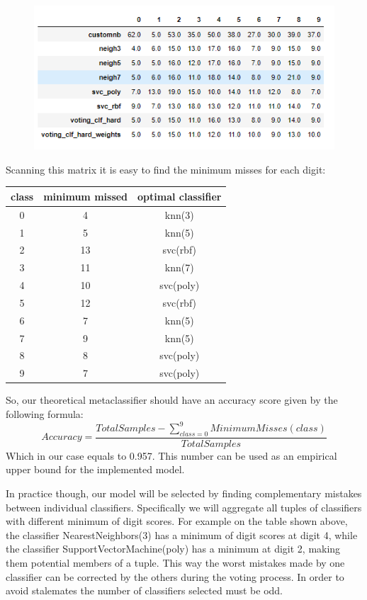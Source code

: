 \documentclass{article}
\begin{document}
    \begin{figure}[ht]
        \includegraphics[width = 1.1\textwidth]{Classifiers_mistakes}
    \end{figure}
    \newpage
    Scanning this matrix it is easy to find the minimum misses for each digit:

        \begin{table}[ht]
            \centering
        
            \begin{tabular}{|c| c| c|}
            \hline
            class & minimum missed & optimal classifier \\
            \hline
            0 & 4 & knn(3)\\
            1 & 5 & knn(5) \\
            2 & 13 & svc(rbf) \\
            3 & 11 & knn(7) \\
            4 & 10 & svc(poly) \\
            5 & 12 & svc(rbf) \\
            6 & 7 & knn(5) \\
            7 & 9 & knn(5) \\
            8 & 8 & svc(poly) \\
            9 & 7 & svc(poly) \\
            \hline
            \end{tabular}
        \end{table}
    
    So, our theoretical metaclassifier should have an accuracy score given by the following formula:
    \[Accuracy = \frac{TotalSamples - \sum\limits_{class =0}^{9}MinimumMisses(class)}{TotalSamples}\]
    Which in our case equals to 0.957. This number can be used as an empirical upper bound for the implemented model.

    In practice though, our model will be selected by finding complementary mistakes between individual classifiers.
    Specifically we will aggregate all tuples of classifiers with different minimum of digit scores.
    For example on the table shown above, the classifier NearestNeighbors(3) has a minimum of digit scores at digit 4, while the classifier SupportVectorMachine(poly) has a minimum at digit 2,
    making them potential members of a tuple.
    This way the worst mistakes made by one classifier can be corrected by the others during the voting process.
    In order to avoid stalemates the number of classifiers selected must be odd.
\end{document}
